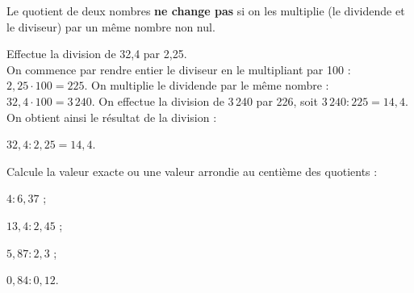 
\begin{methode*1}

\begin{aconnaitre}
Le quotient de deux nombres \textbf{ne change pas} si on les multiplie (le dividende et le diviseur) par un même nombre non nul.
\end{aconnaitre}

\begin{exemple*1}
Effectue la division de 32,4 par 2,25.\\[1em]
On commence par rendre entier le diviseur en le multipliant par 100 : $2,25 \cdot 100 = 225$. On multiplie le dividende par le même nombre : $32,4 \cdot 100 = 3\,240$. On effectue la division de 3\,240  par 226, soit $3\,240 : 225 = 14,4$. On obtient ainsi le résultat de la division :

$32,4 : 2,25 = 14,4$. 
\end{exemple*1}

\exercice
Calcule la valeur exacte ou une valeur arrondie au centième des quotients :
\begin{colenumerate}{4}
 \item $4 : 6,37$ ;
 \item $13,4 : 2,45$ ;
 \item $5,87 : 2,3$ ;
 \item $0,84 : 0,12$.
 \end{colenumerate}

\end{methode*1}


